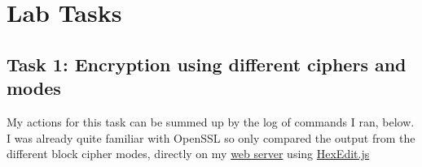 %
%
% 
%
\setcounter{page}{1}
\section{Lab Tasks}
	\subsection{Task 1: Encryption using different ciphers and modes}
		My actions for this task can be summed up by the log of commands I ran, below. I was already quite familiar with OpenSSL so only compared the output from the different block cipher modes, directly on my \href{http://andrewbeveridge.co.uk/comnetsec/}{web server} using \href{http://hexedit.duttke.de}{HexEdit.js}
